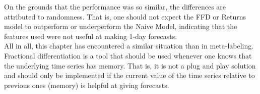 \documentclass[a4paper]{report}
\begin{document}
On the grounds that the performance was so similar, the differences are 
attributed to randomness. That is, one should not expect the FFD or Returns 
model to outperform or underperform the Naive Model, indicating that the 
features used were not useful at making 1-day forecasts.\\

All in all, this chapter has encountered a similar situation than in 
meta-labeling. Fractional differentiation is a tool that should be used 
whenever one knows that the underlying time series has memory. That is, it is 
not a plug and play solution and should only be implemented if the current 
value of the time series relative to previous ones (memory) is helpful at 
giving forecasts.





\newpage

\end{document}

